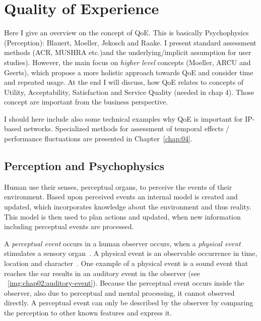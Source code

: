 \chapter{Quality of Experience}\label{chap:02}
\begin{chapter-abstract}
Here I give an overview on the concept of \ac{QoE}.
This is basically Psychophysics (Perception): Blauert, Moeller, Jekosch and Raake.
I present standard assessment methods (\ac{ACR}, \ac{MUSHRA} etc.)and the underlying/implicit assumption for user studies).
However, the main focus on \textit{higher level} concepts (Moeller, ARCU and Geerts), which propose a more holistic approach towards \ac{QoE} and consider time and repeated usage.
At the end I will discuss, how \ac{QoE} relates to concepts of Utility, Acceptability, Satisfaction and Service Quality (needed in chap 4).
Those concept are important from the business perspective.

I should here include also some technical examples why \ac{QoE} is important for \ac{IP}-based networks.
Specialized methods for assessment of temporal effects / performance fluctuations are presented in Chapter~\ref{chap:04}.
\end{chapter-abstract}


\section{Perception and Psychophysics}
Human use their senses, \ie perceptual organs, to perceive the events of their environment.
Based upon perceived events an internal model is created and updated, which incorporates knowledge about the environment and thus reality.
This model is then used to plan actions and updated, when new information including perceptual events are processed.

A \emph{perceptual event} occurs in a human observer occurs, when a \emph{physical event} stimulates a sensory organ~\cite{blauert_spatial_1996}.
A physical event is an observable occurrence in time, location and character~\cite{callet_qualinet_2013}.
One example of a physical event is a sound event that reaches the ear results in an auditory event in the observer (see ~\ref{img:chap02:auditory-event}).
Because the perceptual event occurs inside the observer, also due to perceptual and mental processing, it cannot observed directly.
A perceptual event can only be described by the observer by comparing the perception to other known features and express it.

